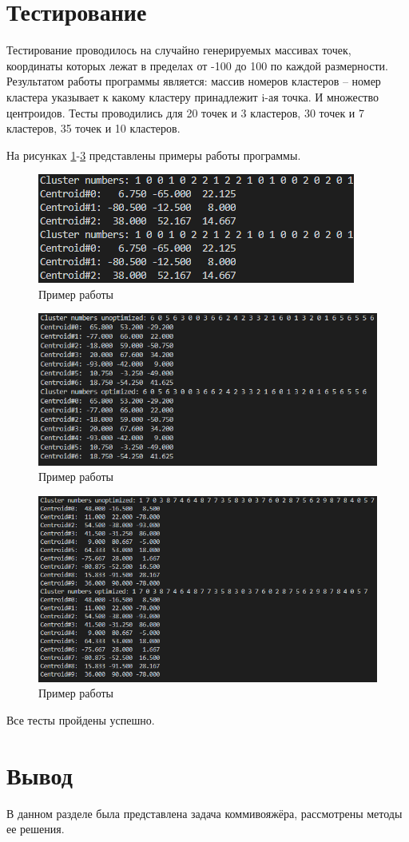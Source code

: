 \section{Тестирование}
\label{sec:tests}
Тестирование проводилось на случайно генерируемых массивах точек, координаты которых лежат в пределах от -100 до 100 по каждой размерности. Результатом работы программы является: массив номеров кластеров -- номер кластера указывает к какому кластеру принадлежит i-ая точка. И множество центроидов. Тесты проводились для 20 точек и 3 кластеров, 30 точек и 7 кластеров, 35 точек и 10 кластеров. 
\par На рисунках \ref{fig:screenshot001}-\ref{fig:screenshot003} представлены примеры работы программы.
\begin{figure}[H]
	\centering
	\includegraphics[width=0.5\linewidth]{src/screenshot001}
	\caption{Пример работы}
	\label{fig:screenshot001}
\end{figure}
\begin{figure}[H]
	\centering
	\includegraphics[width=0.5\linewidth]{src/screenshot002}
	\caption{Пример работы}
	\label{fig:screenshot002}
\end{figure}
\begin{figure}[H]
	\centering
	\includegraphics[width=0.7\linewidth]{src/screenshot003}
	\caption{Пример работы}
	\label{fig:screenshot003}
\end{figure}
Все тесты пройдены успешно.



\section{Вывод}
\label{sec:res}
В данном разделе была представлена задача коммивояжёра, рассмотрены методы ее решения.